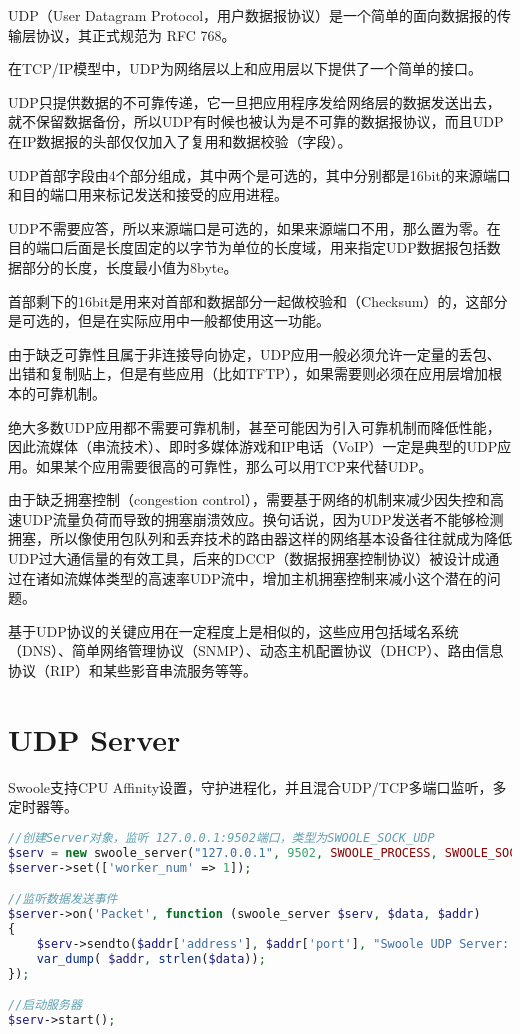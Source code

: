 UDP（User Datagram Protocol，用户数据报协议）是一个简单的面向数据报的传输层协议，其正式规范为 RFC 768。

在TCP/IP模型中，UDP为网络层以上和应用层以下提供了一个简单的接口。

UDP只提供数据的不可靠传递，它一旦把应用程序发给网络层的数据发送出去，就不保留数据备份，所以UDP有时候也被认为是不可靠的数据报协议，而且UDP在IP数据报的头部仅仅加入了复用和数据校验（字段）。

UDP首部字段由4个部分组成，其中两个是可选的，其中分别都是16bit的来源端口和目的端口用来标记发送和接受的应用进程。

UDP不需要应答，所以来源端口是可选的，如果来源端口不用，那么置为零。在目的端口后面是长度固定的以字节为单位的长度域，用来指定UDP数据报包括数据部分的长度，长度最小值为8byte。

首部剩下的16bit是用来对首部和数据部分一起做校验和（Checksum）的，这部分是可选的，但是在实际应用中一般都使用这一功能。

由于缺乏可靠性且属于非连接导向协定，UDP应用一般必须允许一定量的丢包、出错和复制贴上，但是有些应用（比如TFTP），如果需要则必须在应用层增加根本的可靠机制。

绝大多数UDP应用都不需要可靠机制，甚至可能因为引入可靠机制而降低性能，因此流媒体（串流技术）、即时多媒体游戏和IP电话（VoIP）一定是典型的UDP应用。如果某个应用需要很高的可靠性，那么可以用TCP来代替UDP。

由于缺乏拥塞控制（congestion control），需要基于网络的机制来减少因失控和高速UDP流量负荷而导致的拥塞崩溃效应。换句话说，因为UDP发送者不能够检测拥塞，所以像使用包队列和丢弃技术的路由器这样的网络基本设备往往就成为降低UDP过大通信量的有效工具，后来的DCCP（数据报拥塞控制协议）被设计成通过在诸如流媒体类型的高速率UDP流中，增加主机拥塞控制来减小这个潜在的问题。

基于UDP协议的关键应用在一定程度上是相似的，这些应用包括域名系统（DNS）、简单网络管理协议（SNMP）、动态主机配置协议（DHCP）、路由信息协议（RIP）和某些影音串流服务等等。


\section{UDP Server}

Swoole支持CPU Affinity设置，守护进程化，并且混合UDP/TCP多端口监听，多定时器等。

\begin{lstlisting}[language=PHP]
//创建Server对象，监听 127.0.0.1:9502端口，类型为SWOOLE_SOCK_UDP
$serv = new swoole_server("127.0.0.1", 9502, SWOOLE_PROCESS, SWOOLE_SOCK_UDP); 
$server->set(['worker_num' => 1]);

//监听数据发送事件
$server->on('Packet', function (swoole_server $serv, $data, $addr)
{
    $serv->sendto($addr['address'], $addr['port'], "Swoole UDP Server: $data" );
    var_dump( $addr, strlen($data));
});

//启动服务器
$serv->start(); 
\end{lstlisting}

